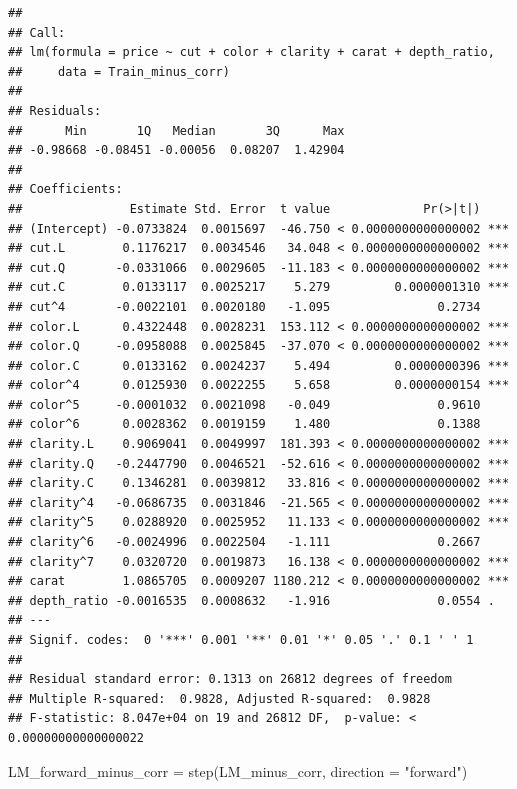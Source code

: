 \documentclass[
]{article}
\newenvironment{Shaded}{\begin{snugshade}}{\end{snugshade}}
\newcommand{\AttributeTok}[1]{\textcolor[rgb]{0.77,0.63,0.00}{#1}}
\newcommand{\FunctionTok}[1]{\textcolor[rgb]{0.00,0.00,0.00}{#1}}
\newcommand{\NormalTok}[1]{#1}
\newcommand{\OtherTok}[1]{\textcolor[rgb]{0.56,0.35,0.01}{#1}}
\newcommand{\StringTok}[1]{\textcolor[rgb]{0.31,0.60,0.02}{#1}}
\begin{document}
\begin{verbatim}
## 
## Call:
## lm(formula = price ~ cut + color + clarity + carat + depth_ratio, 
##     data = Train_minus_corr)
## 
## Residuals:
##      Min       1Q   Median       3Q      Max 
## -0.98668 -0.08451 -0.00056  0.08207  1.42904 
## 
## Coefficients:
##               Estimate Std. Error  t value             Pr(>|t|)    
## (Intercept) -0.0733824  0.0015697  -46.750 < 0.0000000000000002 ***
## cut.L        0.1176217  0.0034546   34.048 < 0.0000000000000002 ***
## cut.Q       -0.0331066  0.0029605  -11.183 < 0.0000000000000002 ***
## cut.C        0.0133117  0.0025217    5.279         0.0000001310 ***
## cut^4       -0.0022101  0.0020180   -1.095               0.2734    
## color.L      0.4322448  0.0028231  153.112 < 0.0000000000000002 ***
## color.Q     -0.0958088  0.0025845  -37.070 < 0.0000000000000002 ***
## color.C      0.0133162  0.0024237    5.494         0.0000000396 ***
## color^4      0.0125930  0.0022255    5.658         0.0000000154 ***
## color^5     -0.0001032  0.0021098   -0.049               0.9610    
## color^6      0.0028362  0.0019159    1.480               0.1388    
## clarity.L    0.9069041  0.0049997  181.393 < 0.0000000000000002 ***
## clarity.Q   -0.2447790  0.0046521  -52.616 < 0.0000000000000002 ***
## clarity.C    0.1346281  0.0039812   33.816 < 0.0000000000000002 ***
## clarity^4   -0.0686735  0.0031846  -21.565 < 0.0000000000000002 ***
## clarity^5    0.0288920  0.0025952   11.133 < 0.0000000000000002 ***
## clarity^6   -0.0024996  0.0022504   -1.111               0.2667    
## clarity^7    0.0320720  0.0019873   16.138 < 0.0000000000000002 ***
## carat        1.0865705  0.0009207 1180.212 < 0.0000000000000002 ***
## depth_ratio -0.0016535  0.0008632   -1.916               0.0554 .  
## ---
## Signif. codes:  0 '***' 0.001 '**' 0.01 '*' 0.05 '.' 0.1 ' ' 1
## 
## Residual standard error: 0.1313 on 26812 degrees of freedom
## Multiple R-squared:  0.9828, Adjusted R-squared:  0.9828 
## F-statistic: 8.047e+04 on 19 and 26812 DF,  p-value: < 0.00000000000000022
\end{verbatim}

\begin{Shaded}
\begin{Highlighting}[]
\NormalTok{LM\_forward\_minus\_corr }\OtherTok{=} \FunctionTok{step}\NormalTok{(LM\_minus\_corr, }\AttributeTok{direction =} \StringTok{"forward"}\NormalTok{)}
\end{Highlighting}
\end{Shaded}
\end{document}
